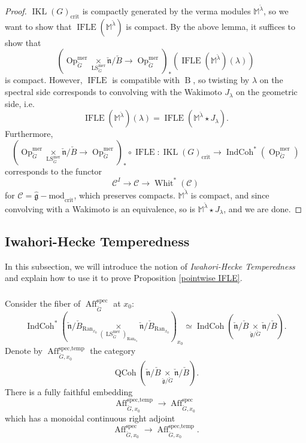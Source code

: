\documentclass[10pt,a4paper]{amsart}
\newcommand{\on}[1]{\operatorname{#1}}
\newcommand{\QCoh}{\on{QCoh}}
\newcommand{\IndCoh}{\on{IndCoh}}
\newcommand{\gmod}{\on{\hat{\mathfrak{g}}-mod}}
\newcommand{\IKL}{\on{IKL}(G)_{\on{crit}}}
\newcommand{\Gcheck}{\check{G}}
\newcommand{\gcheck}{\check{\mathfrak{g}}}
\newcommand{\ncheck}{\check{\mathfrak{n}}}
\newcommand{\Bcheck}{\check{B}}
\newcommand{\Ran}{\on{Ran}}
\newcommand{\sssec}[1]{\subsubsection{}}
\begin{document}
\begin{proof}
    $\IKL$ is compactly generated by the verma modules $\mathbb{M}^{\check{\lambda}}$, so we want to show that $\on{IFLE}(\mathbb{M}^{\check{\lambda}})$ is compact. By the above lemma, it suffices to show that
    $$
    (\on{Op}_{\Gcheck}^{\on{mer}} \underset{\on{LS}_{\Gcheck}^{\on{mer}}}{\times} \ncheck/\Bcheck \to \on{Op}_{\Gcheck}^{\on{mer}})_*(\on{IFLE}(\mathbb{M}^{\check{\lambda}})(\lambda))
    $$
    is compact. However, $\on{IFLE}$ is compatible with $\on{B}$, so twisting by $\lambda$ on the spectral side corresponds to convolving with the Wakimoto $J_{\lambda}$ on the geometric side, i.e.
    $$
    \on{IFLE}(\mathbb{M}^{\check{\lambda}})(\lambda) = \on{IFLE}(\mathbb{M}^{\check{\lambda}} \star J_{\lambda}).
    $$
    Furthermore, 
    $$
    (\on{Op}_{\Gcheck}^{\on{mer}} \underset{\on{LS}_{\Gcheck}^{\on{mer}}}{\times} \ncheck/\Bcheck \to \on{Op}_{\Gcheck}^{\on{mer}})_* \circ \on{IFLE} : \IKL \longrightarrow \IndCoh^*(\on{Op}_{\Gcheck}^{\on{mer}})
    $$
    corresponds to the functor
    $$
    \mathcal{C}^I \longrightarrow \mathcal{C} \longrightarrow \on{Whit}^*(\mathcal{C})
    $$
    for $\mathcal{C} = \gmod_{\on{crit}}$, which preserves compacts. $\mathbb{M}^{\check{\lambda}}$ is compact, and since convolving with a Wakimoto is an equivalence, so is $\mathbb{M}^{\check{\lambda}} \star J_{\lambda}$, and we are done.
\end{proof}

\subsection{Iwahori-Hecke Temperedness} \label{Affine Temperedness}
In this subsection, we will introduce the notion of \emph{Iwahori-Hecke Temperedness} and explain how to use it to prove Proposition \ref{pointwise IFLE}.

\sssec{}
Consider the fiber of $\on{Aff}_{\Gcheck}^{\on{spec}}$ at $x_0$:
$$
\IndCoh^*(\ncheck/\Bcheck_{\Ran_{x_0}} \underset{(\on{LS}_{\Gcheck}^{\on{mer}})_{\Ran_{x_0}}}{\times} \ncheck/\Bcheck_{\Ran_{x_0}})_{x_0} \simeq \IndCoh(\ncheck/\Bcheck \underset{\gcheck/\Gcheck}{\times} \ncheck/\Bcheck).
$$
Denote by $\on{Aff}_{\Gcheck, x_0}^{\on{spec, temp}}$ the category
$$
\QCoh(\ncheck/\Bcheck \underset{\gcheck/\Gcheck}{\times} \ncheck/\Bcheck).
$$
There is a fully faithful embedding
$$
\on{Aff}_{\Gcheck, x_0}^{\on{spec, temp}} \to \on{Aff}_{\Gcheck, x_0}^{\on{spec}}
$$
which has a monoidal continuous right adjoint
$$
\on{Aff}_{\Gcheck, x_0}^{\on{spec}} \to \on{Aff}_{\Gcheck, x_0}^{\on{spec, temp}}.
$$
\end{document}
